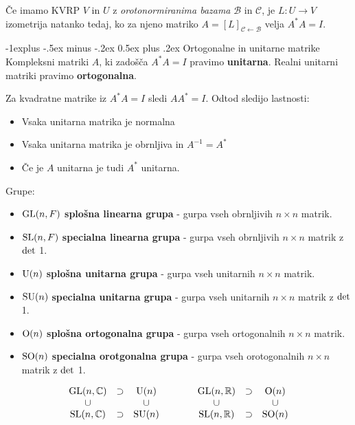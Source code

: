 \documentclass[a4paper,landscape]{article}
\makeatletter
\renewcommand{\subsection}{\@startsection{subsection}{2}{0mm}%
                                {-1explus -.5ex minus -.2ex}%
                                {0.5ex plus .2ex}%
                                {\normalfont\normalsize\bfseries}}
\makeatother
\begin{document}
\begin{multicols}{3}
Če imamo KVRP $V$ in $U$ z \emph{orotonormiranima bazama} $\mathcal{B}$ in $\mathcal{C}$, je $L: U\to V$ izometrija
natanko tedaj, ko za njeno matriko $A=[L]_{\mathcal{C \leftarrow B}}$ velja $A^*A = I$.

\subsection{Ortogonalne in unitarne matrike}
Kompleksni matriki $A$, ki zadošča $A^*A = I$ pravimo \textbf{unitarna}.
Realni unitarni matriki pravimo \textbf{ortogonalna}.

Za kvadratne matrike iz $A^*A = I$ sledi $AA^* = I$. Odtod sledijo lastnosti:
\begin{itemize}
    \item Vsaka unitarna matrika je normalna
    \item Vsaka unitarna matrika je obrnljiva in $A^{-1} = A^*$
    \item Če je $A$ unitarna je tudi $A^*$ unitarna.
\end{itemize}

Grupe:
\begin{itemize}
    \item $\textmd{GL}(n,F)$ \textbf{splošna linearna grupa} - gurpa vseh obrnljivih $n \times n$ matrik.
    \item $\textmd{SL}(n,F)$ \textbf{specialna linearna grupa} - gurpa vseh obrnljivih $n \times n$ matrik z $\textmd{det}$ 1.
    \item $\textmd{U}(n)$ \textbf{splošna unitarna grupa} - gurpa vseh unitarnih $n \times n$ matrik.
    \item $\textmd{SU}(n)$ \textbf{specialna unitarna grupa} - gurpa vseh unitarnih $n \times n$ matrik z $\textmd{det}$ 1.
    \item $\textmd{O}(n)$ \textbf{splošna ortogonalna grupa} - gurpa vseh ortogonalnih $n \times n$ matrik.
    \item $\textmd{SO}(n)$ \textbf{specialna orotgonalna grupa} - gurpa vseh orotogonalnih $n \times n$ matrik z $\textmd{det}$ 1.
\end{itemize}

\begin{equation*}
    \begin{aligned}
        \begin{matrix}
            \textmd{GL}(n, \mathbb{C}) & \supset & \textmd{U}(n) \\
            \cup &  & \cup \\
            \textmd{SL}(n, \mathbb{C}) & \supset & \textmd{SU}(n) \\
        \end{matrix}
        \qquad \qquad
        \begin{matrix}
            \textmd{GL}(n, \mathbb{R}) & \supset & \textmd{O}(n) \\
            \cup &  & \cup \\
            \textmd{SL}(n, \mathbb{R}) & \supset & \textmd{SO}(n) \\
        \end{matrix}
    \end{aligned}
\end{equation*}


\end{multicols}
\end{document}
